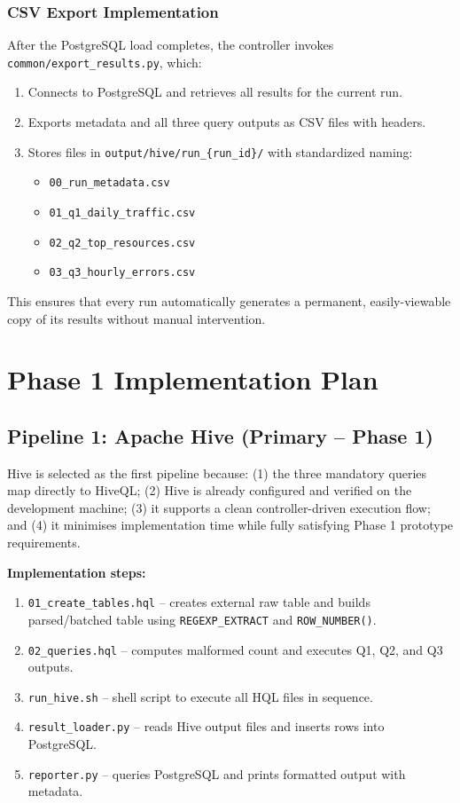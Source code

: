 \documentclass[12pt,a4paper]{article}
\begin{document}
\subsubsection{CSV Export Implementation}
After the PostgreSQL load completes, the controller invokes \texttt{common/export\_results.py}, which:
\begin{enumerate}
    \item Connects to PostgreSQL and retrieves all results for the current run.
    \item Exports metadata and all three query outputs as CSV files with headers.
    \item Stores files in \texttt{output/hive/run\_\{run\_id\}/} with standardized naming:
    \begin{itemize}
        \item \texttt{00\_run\_metadata.csv}
        \item \texttt{01\_q1\_daily\_traffic.csv}
        \item \texttt{02\_q2\_top\_resources.csv}
        \item \texttt{03\_q3\_hourly\_errors.csv}
    \end{itemize}
\end{enumerate}

This ensures that every run automatically generates a permanent, easily-viewable copy of its results without manual intervention.

\section{Phase 1 Implementation Plan}

\subsection{Pipeline 1: Apache Hive (Primary -- Phase 1)}
Hive is selected as the first pipeline because: (1) the three mandatory queries map directly to HiveQL; (2) Hive is already configured and verified on the development machine; (3) it supports a clean controller-driven execution flow; and (4) it minimises implementation time while fully satisfying Phase 1 prototype requirements.

\textbf{Implementation steps:}
\begin{enumerate}
    \item \texttt{01\_create\_tables.hql} -- creates external raw table and builds parsed/batched table using \texttt{REGEXP\_EXTRACT} and \texttt{ROW\_NUMBER()}.
    \item \texttt{02\_queries.hql} -- computes malformed count and executes Q1, Q2, and Q3 outputs.
    \item \texttt{run\_hive.sh} -- shell script to execute all HQL files in sequence.
    \item \texttt{result\_loader.py} -- reads Hive output files and inserts rows into PostgreSQL.
    \item \texttt{reporter.py} -- queries PostgreSQL and prints formatted output with metadata.
\end{enumerate}
\end{document}
